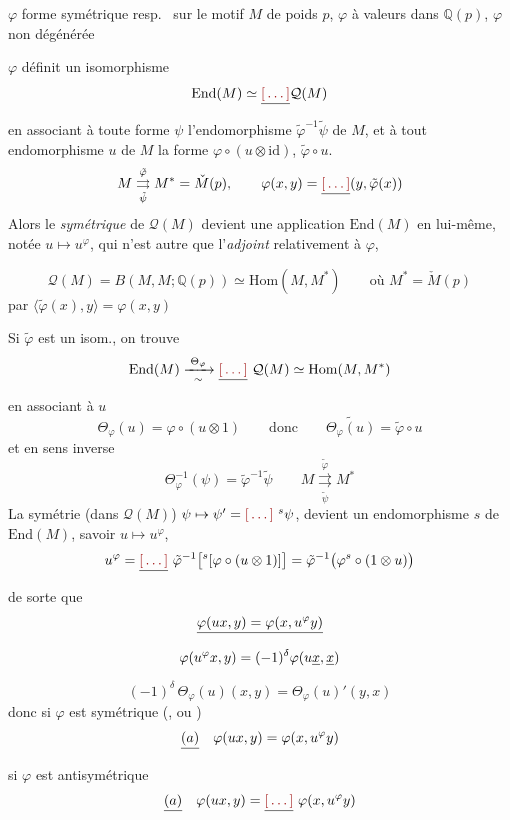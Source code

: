 \documentclass[11pt,a4paper]{article}
\begin{document}
$\varphi$ forme symétrique resp.\  sur le motif $M$ de
poids $p$, $\varphi$ à valeurs dans $\mathbb{Q}(p)$, $\varphi$ non dégénérée

$\varphi$ définit un isomorphisme
\[
\mathrm{End}(M) \simeq \struck{\ill{}} \mathcal{Q}(M)
\]
en associant à toute forme $\psi$ l'endomorphisme
$\tilde{\varphi}^{-1}\tilde{\psi}$ de $M$, et à tout endomorphisme $u$ de $M$
la forme $\varphi \circ (u \otimes \mathrm{id})$, 
 $\tilde{\varphi} \circ u$.
\[
M \underset{\tilde{\psi}}{\overset{\tilde{\varphi}}{\rightrightarrows}} M^{*} = \check{M}(p),
\qquad
\varphi(x,y) = \struck{\ill{}} (y, \tilde{\varphi}(x))
\]
Alors le \emph{symétrique} \struck{\ill{}} de $\mathcal{Q}(M)$ devient une
application  $\mathrm{End}(M)$ en lui-même, notée
$u \mapsto u^{\varphi}$, qui n'est autre que l'\emph{adjoint} relativement à
$\varphi$,

\[
\mathcal{Q}(M) = B(M, M ; \mathbb{Q}(p)) \simeq \mathrm{Hom}(M, M^{*})
\qquad \text{où } M^{*} = \check{M}(p)
\]
par $\langle \tilde{\varphi}(x), y\rangle = \varphi(x,y)$

Si $\tilde{\varphi}$ est un isom., on trouve
\[
\mathrm{End}(M) \xrightarrow[\;\sim\;]{\;\Theta_{\varphi}\;} \struck{\ill{}}\ \mathcal{Q}(M) \simeq \mathrm{Hom}(M, M^{*})
\]
en associant à $u$
\[
\Theta_{\varphi}(u) = \varphi \circ (u \otimes 1)
\qquad\text{donc}\qquad
\widetilde{\Theta_{\varphi}(u)} = \tilde{\varphi} \circ u
\]
et en sens inverse
\[
\Theta_{\varphi}^{-1}(\psi) = \tilde{\varphi}^{-1} \tilde{\psi}
\qquad
M \underset{\tilde{\psi}}{\overset{\tilde{\varphi}}{\rightrightarrows}} M^{*}
\]
La symétrie (dans $\mathcal{Q}(M)$) $\psi \mapsto \psi' = \ill{}\ {}^{s}\psi$,
devient un endomorphisme $s$ de $\mathrm{End}(M)$, \struck{\ill{}} savoir
$u \mapsto u^{\varphi}$,
\[
u^{\varphi} = \struck{\ill{}}\ \tilde{\varphi}^{-1}\bigl[{}^{s}[\varphi \circ (u \otimes 1)]\bigr]
= \tilde{\varphi}^{-1}\bigl(\varphi^{s} \circ (1 \otimes u)\bigr)
\]
de sorte que
\[
\struck{\varphi(ux, y) = \varphi(x, u^{\varphi} y)}
\]
\[
\varphi(u^{\varphi} x, y) = (-1)^{\delta} \varphi(u\struck{x}, \struck{x})
\]
\[
(-1)^{\delta}\, \Theta_{\varphi}(u)(x,y) = \Theta_{\varphi}(u)'(y,x)
\]
donc si $\varphi$ est symétrique (, ou \ill{})
\[
\struck{(a)}\quad \varphi(ux, y) = \varphi(x, u^{\varphi} y)
\]
si $\varphi$ est \struck{\ill{}} antisymétrique 
\[
\struck{(a)}\quad \varphi(ux, y) = \struck{\ill{}}\ \varphi(x, u^{\varphi} y)
\]
\end{document}
